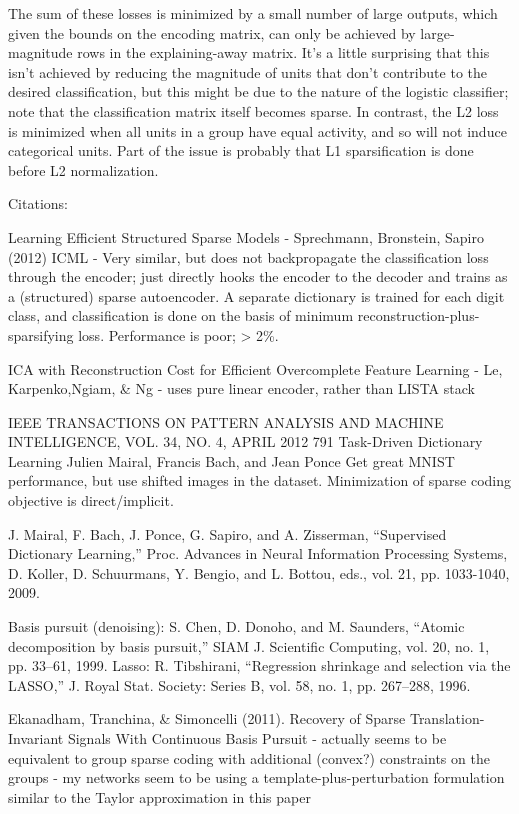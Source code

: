 The sum of these losses is minimized by a small number of large outputs, which given the bounds on the encoding matrix, can only be achieved by large-magnitude rows in the explaining-away matrix.  It's a little surprising that this isn't achieved by reducing the magnitude of units that don't contribute to the desired classification, but this might be due to the nature of the logistic classifier; note that the classification matrix itself becomes sparse.  In contrast, the L2 loss is minimized when all units in a group have equal activity, and so will not induce categorical units.  Part of the issue is probably that L1 sparsification is done before L2 normalization.  




Citations:

Learning Efficient Structured Sparse Models - Sprechmann, Bronstein, Sapiro (2012) ICML - Very similar, but does not backpropagate the classification loss through the encoder; just directly hooks the encoder to the decoder and trains as a (structured) sparse autoencoder.  A separate dictionary is trained for each digit class, and classification is done on the basis of minimum reconstruction-plus-sparsifying loss.  Performance is poor; > 2\%.  

ICA with Reconstruction Cost for Efficient Overcomplete Feature Learning - Le, Karpenko,Ngiam, \& Ng - uses pure linear encoder, rather than LISTA stack

IEEE TRANSACTIONS ON PATTERN ANALYSIS AND MACHINE INTELLIGENCE, VOL. 34, NO. 4, APRIL 2012 791
Task-Driven Dictionary Learning Julien Mairal, Francis Bach, and Jean Ponce
Get great MNIST performance, but use shifted images in the dataset.  Minimization of sparse coding objective is direct/implicit.

J. Mairal, F. Bach, J. Ponce, G. Sapiro, and A. Zisserman, “Supervised Dictionary Learning,” Proc. Advances in Neural Information Processing Systems, D. Koller, D. Schuurmans, Y. Bengio, and L. Bottou, eds., vol. 21, pp. 1033-1040, 2009.

Basis pursuit (denoising): S. Chen, D. Donoho, and M. Saunders, “Atomic decomposition by basis pursuit,” SIAM J. Scientific Computing, vol. 20, no. 1, pp. 33–61, 1999.
Lasso: R. Tibshirani, “Regression shrinkage and selection via the LASSO,” J. Royal Stat. Society: Series B, vol. 58, no. 1, pp. 267–288, 1996.

Ekanadham, Tranchina, \& Simoncelli (2011). Recovery of Sparse Translation-Invariant Signals With Continuous Basis Pursuit  - actually seems to be equivalent to group sparse coding with additional (convex?) constraints on the groups - my networks seem to be using a template-plus-perturbation formulation similar to the Taylor approximation in this paper



